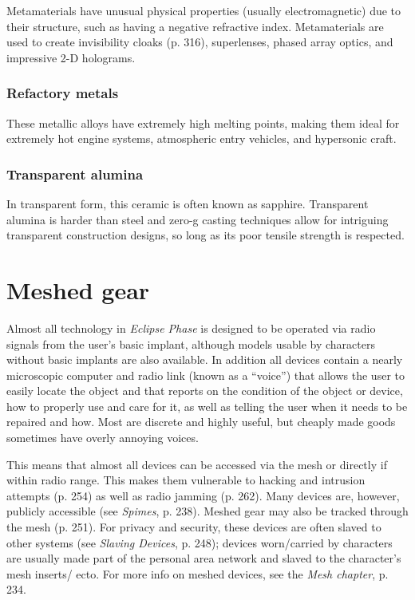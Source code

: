 Metamaterials have unusual physical properties (usually electromagnetic) due to their structure, such as having a negative refractive index. Metamaterials are used to create invisibility cloaks (p. 316), superlenses, phased array optics, and impressive 2-D holograms. 

\subsubsection{Refactory metals} 

These metallic alloys have extremely high melting points, making them ideal for extremely hot engine systems, atmospheric entry vehicles, and hypersonic craft. 

\subsubsection{Transparent alumina} 

In transparent form, this ceramic is often known as sapphire. Transparent alumina is harder than steel and zero-g casting techniques allow for intriguing transparent construction designs, so long as its poor tensile strength is respected. 



\section{Meshed gear} \label{sec:meshed-gear} 

Almost all technology in \emph{Eclipse Phase} is designed to be operated via radio signals from the user’s basic implant, although models usable by characters without basic implants are also available. In addition all devices contain a nearly microscopic computer and radio link (known as a ``voice'') that allows the user to easily locate the object and that reports on the condition of the object or device, how to properly use and care for it, as well as telling the user when it needs to be repaired and how. Most are discrete and highly useful, but cheaply made goods sometimes have overly annoying voices. 

This means that almost all devices can be accessed via the mesh or directly if within radio range. This makes them vulnerable to hacking and intrusion attempts (p. 254) as well as radio jamming (p. 262). Many devices are, however, publicly accessible (see \emph{Spimes}, p. 238). Meshed gear may also be tracked through the mesh (p. 251). For privacy and security, these devices are often slaved to other systems (see \emph{Slaving Devices}, p. 248); devices worn/carried by characters are usually made part of the personal area network and slaved to the character’s mesh inserts/ ecto. For more info on meshed devices, see the \emph{Mesh chapter}, p. 234. 

